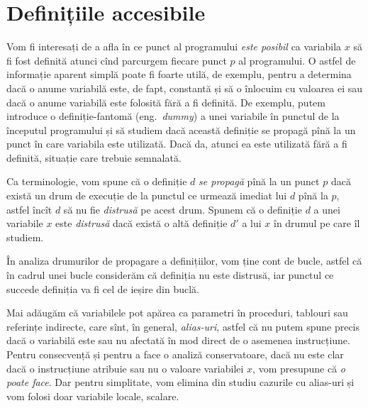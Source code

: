 
\chapter{Definițiile accesibile}

Vom fi interesați de a afla în ce punct al programului \emph{este posibil}
ca variabila $ x $ să fi fost definită atunci cînd parcurgem fiecare
punct $ p $ al programului. O astfel de informație aparent simplă poate fi
foarte utilă, de exemplu, pentru a determina dacă o anume variabilă este,
de fapt, constantă și să o înlocuim cu valoarea ei sau dacă o anume variabilă
este folosită fără a fi definită. De exemplu, putem introduce o
definiție-fantomă (eng.\ \emph{dummy}) a unei variabile în punctul de la
începutul programului și să studiem dacă această definiție se propagă pînă la
un punct în care variabila este utilizată. Dacă da, atunci ea este utilizată
fără a fi definită, situație care trebuie semnalată.

Ca terminologie, vom spune că o definiție $ d $ \emph{se propagă} pînă la
un punct $ p $ dacă există un drum de execuție de la punctul ce urmează imediat
lui $ d $ pînă la $ p $, astfel încît $ d $ să nu fie \emph{distrusă} pe acest
drum. Spunem că o definiție $ d $ a unei variabile $ x $ este \emph{distrusă}
dacă există o altă definiție $ d' $ a lui $ x $ în drumul pe care îl studiem.

\begin{remark}\label{rk:def-loop}
  În analiza drumurilor de propagare a definițiilor, vom ține cont de bucle,
  astfel că în cadrul unei bucle considerăm că definiția nu este distrusă,
  iar punctul ce succede definiția va fi cel de ieșire din buclă.
\end{remark}

Mai adăugăm că variabilele pot apărea ca parametri în proceduri, tablouri
sau referințe indirecte, care sînt, în general, \emph{alias-uri}, astfel că
nu putem spune precis dacă o variabilă este sau nu afectată în mod direct
de o asemenea instrucțiune. Pentru consecvență și pentru a face o analiză
conservatoare, dacă nu este clar dacă o instrucțiune atribuie sau nu o valoare
variabilei $ x $, vom presupune că \emph{o poate face}. Dar pentru simplitate,
vom elimina din studiu cazurile cu alias-uri și vom folosi doar variabile
locale, scalare.

